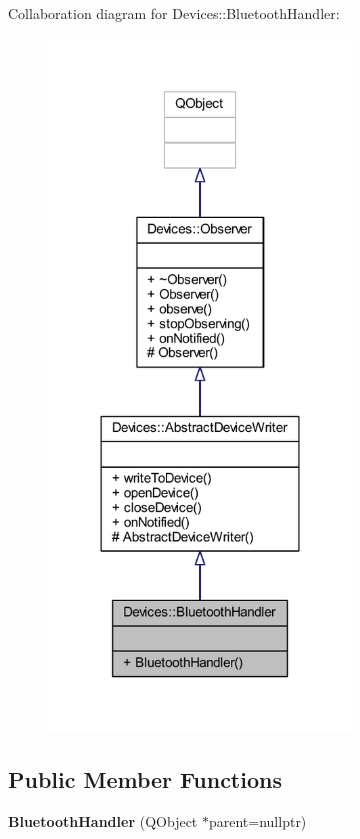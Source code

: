Collaboration diagram for Devices\+:\+:Bluetooth\+Handler\+:\nopagebreak
\begin{figure}[H]
\begin{center}
\leavevmode
\includegraphics[width=228pt]{dd/ddf/class_devices_1_1_bluetooth_handler__coll__graph}
\end{center}
\end{figure}
\subsection*{Public Member Functions}
\begin{DoxyCompactItemize}
\item 
\mbox{\label{class_devices_1_1_bluetooth_handler_ac277c4c65fe0431d33d5875cc3878379}} 
{\bfseries Bluetooth\+Handler} (Q\+Object $\ast$parent=nullptr)
\end{DoxyCompactItemize}
